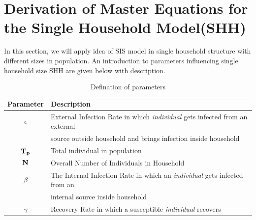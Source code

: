 \documentclass[paper=a4, fontsize=11pt, twoside, BCOR=12mm, parskip=full, listof=totoc]{scrreprt}
\begin{document}
\pagebreak
\section{ Derivation of Master Equations for the Single Household Model(SHH)}
In this section, we will apply idea of SIS model in single household structure with different sizes in population. An introduction to parameters influencing single household size SHH are given below with description. 

\begin{table}[H]
	\centering 
	\caption{Defination of parameters}
	\label{Defination of parameter}
	\begin{tabular}{cl}
	\toprule     
     Parameter & Description  \\
    \midrule
	  $\epsilon$  & External Infection Rate in which \emph{individual} gets infected from an external \\ & source outside household and brings infection inside household \\
	  $\bf{T_p}$   & Total individual in population \\
	  $\bf{N}$ &  Overall Number of Individuals in Household\\
      $\beta$ & The Internal Infection Rate in which an \emph{individual} gets infected from an \\ & internal source inside household \\
      $\gamma$  &  Recovery Rate in which a susceptible \emph{individual} recovers \\
	\bottomrule
	\end{tabular}
	
\end{table}
\end{document}
